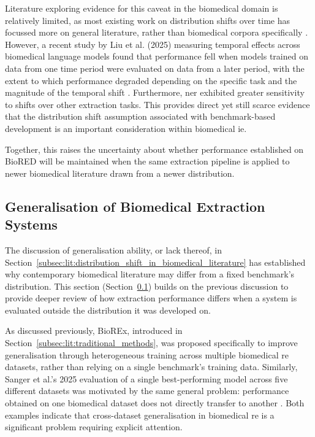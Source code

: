 Literature exploring evidence for this caveat in the biomedical domain is relatively limited, as most existing work on distribution shifts over time has focussed more on general literature, rather than biomedical corpora specifically \pref. However, a recent study by Liu et al. (2025) measuring temporal effects across biomedical language models found that performance fell when models trained on data from one time period were evaluated on data from a later period, with the extent to which performance degraded depending on the specific task and the magnitude of the temporal shift \cite{liu2025time}. Furthermore, \gls{ner} exhibited greater sensitivity to shifts over other extraction tasks. This provides direct yet still scarce evidence that the distribution shift assumption associated with benchmark-based development is an important consideration within biomedical \gls{ie}.

Together, this raises the uncertainty about whether performance established on BioRED will be maintained when the same extraction pipeline is applied to newer biomedical literature drawn from a newer distribution.

\subsection{Generalisation of Biomedical Extraction Systems}
\label{subsec:lit:generalisation_of_biomedical_extraction_systems}
The discussion of generalisation ability, or lack thereof, in Section~\ref{subsec:lit:distribution_shift_in_biomedical_literature} has established why contemporary biomedical literature may differ from a fixed benchmark's distribution. This section (Section~\ref{subsec:lit:generalisation_of_biomedical_extraction_systems}) builds on the previous discussion to provide deeper review of how extraction performance differs when a system is evaluated outside the distribution it was developed on.

As discussed previously, BioREx, introduced in Section~\ref{subsec:lit:traditional_methods}, was proposed specifically to improve generalisation through heterogeneous training across multiple biomedical \gls{re} datasets, rather than relying on a single benchmark's training data. Similarly, Sanger et al.'s 2025 evaluation of a single best-performing model across five different datasets was motivated by the same general problem: performance obtained on one biomedical dataset does not directly transfer to another \cite{sanger2025_fixed_dataset_eval_2}. Both examples indicate that cross-dataset generalisation in biomedical \gls{re} is a significant problem requiring explicit attention.


